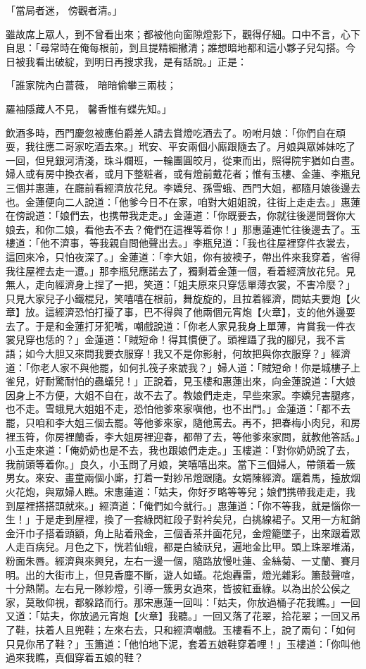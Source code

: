 \begin{showcontents}{}
「當局者迷，  傍觀者清。」

雖故席上眾人，到不曾看出來；都被他向窗隙燈影下，觀得仔細。口中不言，心下自思：「尋常時在俺每根前，到且提精細撇清；誰想暗地都和這小夥子兒勾搭。今日被我看出破綻，到明日再搜求我，是有話說。」正是：

「誰家院內白薔薇，  暗暗偷攀三兩枝；

羅袖隱藏人不見，  馨香惟有蝶先知。」

飲酒多時，西門慶忽被應伯爵差人請去賞燈吃酒去了。吩咐月娘：「你們自在頑耍，我往應二哥家吃酒去來。」玳安、平安兩個小廝跟隨去了。月娘與眾姊妹吃了一回，但見銀河清淺，珠斗爛班，一輪團圓皎月，從東而出，照得院宇猶如白晝。婦人或有房中換衣者，或月下整粧者，或有燈前戴花者；惟有玉樓、金蓮、李瓶兒三個并惠蓮，在廳前看經濟放花兒。李嬌兒、孫雪蛾、西門大姐，都隨月娘後邊去也。金蓮便向二人說道：「他爹今日不在家，咱對大姐姐說，往街上走走去。」惠蓮在傍說道：「娘們去，也携帶我走走。」金蓮道：「你既要去，你就往後邊問聲你大娘去，和你二娘，看他去不去？俺們在這裡等着你！」那惠蓮連忙往後邊去了。玉樓道：「他不濟事，等我親自問他聲出去。」李瓶兒道：「我也往屋裡穿件衣裳去，這回來冷，只怕夜深了。」金蓮道：「李大姐，你有披襖子，帶出件來我穿着，省得我往屋裡去走一遭。」那李瓶兒應諾去了，獨剩着金蓮一個，看着經濟放花兒。見無人，走向經濟身上捏了一把，笑道：「姐夫原來只穿恁單薄衣裳，不害冷麼？」只見大家兒子小鐵棍兒，笑嘻嘻在根前，舞旋旋的，且拉着經濟，問姑夫要炮【火章】放。這經濟恐怕打擾了事，巴不得與了他兩個元宵炮【火章】，支的他外邊耍去了。于是和金蓮打牙犯嘴，嘲戲說道：「你老人家見我身上單薄，肯賞我一件衣裳兒穿也恁的？」金蓮道：「賊短命！得其慣便了。頭裡躡了我的腳兒，我不言語；如今大胆又來問我要衣服穿！我又不是你影射，何故把與你衣服穿？」經濟道：「你老人家不與他罷，如何扎筏子來諕我？」婦人道：「賊短命！你是城樓子上雀兒，好耐驚耐怕的蟲蟻兒！」正說着，見玉樓和惠蓮出來，向金蓮說道：「大娘因身上不方便，大姐不自在，故不去了。教娘們走走，早些來家。李嬌兒害腿疼，也不走。雪蛾見大姐姐不走，恐怕他爹來家嗔他，也不出門。」金蓮道：「都不去罷，只咱和李大姐三個去罷。等他爹來家，隨他罵去。再不，把春梅小肉兒，和房裡玉筲，你房裡蘭香，李大姐房裡迎春，都帶了去，等他爹來家問，就教他答話。」小玉走來道：「俺奶奶也是不去，我也跟娘們走走。」玉樓道：「對你奶奶說了去，我前頭等着你。」良久，小玉問了月娘，笑嘻嘻出來。當下三個婦人，帶領着一簇男女。來安、畫童兩個小廝，打着一對紗吊燈跟隨。女婿陳經濟。躧着馬，擡放烟火花炮，與眾婦人瞧。宋惠蓮道：「姑夫，你好歹略等等兒；娘們携帶我走走，我到屋裡搭搭頭就來。」經濟道：「俺們如今就行。」惠蓮道：「你不等我，就是惱你一生！」于是走到屋裡，換了一套綠閃紅段子對衿矣兒，白挑線裙子。又用一方紅銷金汗巾子搭着頭額，角上貼着飛金，三個香茶并面花兒，金燈籠墜子，出來跟着眾人走百病兒。月色之下，恍若仙蛾，都是白綾祆兒，遍地金比甲。頭上珠翠堆滿，粉面朱唇。經濟與來興兒，左右一邊一個，隨路放慢吐蓮、金絲菊、一丈蘭、賽月明。出的大街市上，但見香塵不斷，遊人如蟻。花炮轟雷，燈光雜彩。簫鼓聲喧，十分熱鬧。左右見一隊紗燈，引導一簇男女過來，皆披紅垂綠。以為出於公侯之家，莫敢仰視，都躲路而行。那宋惠蓮一回叫：「姑夫，你放過桶子花我瞧。」一回又道：「姑夫，你放過元宵炮【火章】我聽。」一回又落了花翠，拾花翠；一回又吊了鞋，扶着人且兜鞋；左來右去，只和經濟嘲戲。玉樓看不上，說了兩句：「如何只見你吊了鞋？」玉簫道：「他怕地下泥，套着五娘鞋穿着哩！」玉樓道：「你叫他過來我瞧，真個穿着五娘的鞋？
\end{showcontents}
